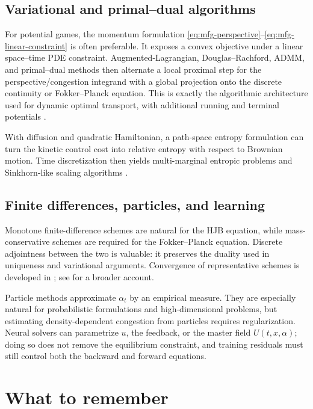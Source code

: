 \documentclass[11pt,a4paper]{article}
\theoremstyle{definition}
\newcommand{\al}{\alpha}
\begin{document}
\subsection{Variational and primal--dual algorithms}

For potential games, the momentum formulation
\eqref{eq:mfg-perspective}--\eqref{eq:mfg-linear-constraint} is often preferable.
It exposes a convex objective under a linear space--time PDE constraint.
Augmented-Lagrangian, Douglas--Rachford, ADMM, and primal--dual methods then
alternate a local proximal step for the perspective/congestion integrand with
a global projection onto the discrete continuity or Fokker--Planck equation.
This is exactly the algorithmic architecture used for dynamic optimal
transport, with additional running and terminal potentials
\citep{BenamouCarlier2015,BenamouCarlierSantambrogio2017}.

With diffusion and quadratic Hamiltonian, a path-space entropy formulation can
turn the kinetic control cost into relative entropy with respect to Brownian
motion.  Time discretization then yields multi-marginal entropic problems and
Sinkhorn-like scaling algorithms \citep{BenamouCarlierDiMarinoNenna2019}.

\subsection{Finite differences, particles, and learning}

Monotone finite-difference schemes are natural for the HJB equation, while
mass-conservative schemes are required for the Fokker--Planck equation.
Discrete adjointness between the two is valuable: it preserves the duality
used in uniqueness and variational arguments.  Convergence of representative
schemes is developed in \citet{AchdouCamilliCapuzzoDolcetta2013}; see
\citet{AchdouLauriere2020} for a broader account.

Particle methods approximate $\al_t$ by an empirical measure.  They are
especially natural for probabilistic formulations and high-dimensional
problems, but estimating density-dependent congestion from particles requires
regularization.  Neural solvers can parametrize $u$, the feedback, or the
master field $U(t,x,\al)$; doing so does not remove the equilibrium
constraint, and training residuals must still control both the backward and
forward equations.

\section{What to remember}
\end{document}
